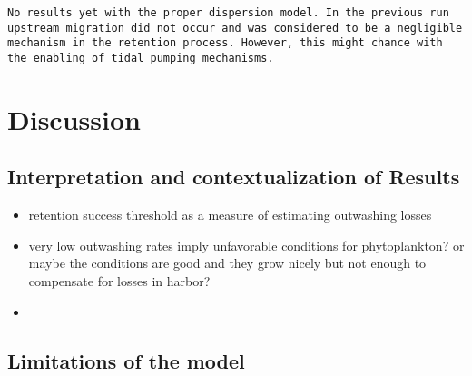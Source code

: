 \texttt{No results yet with the proper dispersion model. 
        In the previous run upstream migration did not occur and was considered 
        to be a negligible mechanism in the retention process.
        However, this might chance with the enabling of tidal pumping mechanisms.}


\section*{Discussion}

\subsection*{Interpretation and contextualization of Results}

\begin{itemize}
    \item retention success threshold as a measure of estimating outwashing losses
    \item very low outwashing rates imply unfavorable conditions for phytoplankton? or maybe the conditions are good and they grow nicely but not enough to compensate for losses in harbor?
    \item 
\end{itemize}



\subsection*{Limitations of the model}

